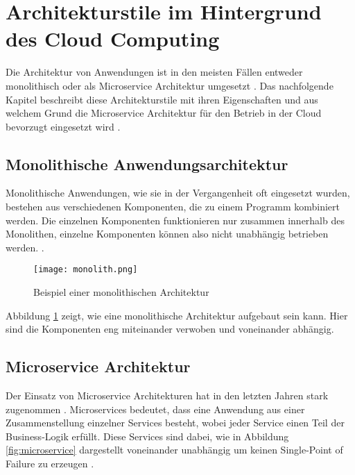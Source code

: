 \section{Architekturstile im Hintergrund des Cloud Computing}
\label{sec:architekturstile}
Die Architektur von Anwendungen ist in den meisten Fällen entweder monolithisch oder als Microservice Architektur umgesetzt \cite[Vgl.][S. 150]{Gos2020}. Das nachfolgende Kapitel beschreibt diese Architekturstile mit ihren Eigenschaften und aus welchem Grund die Microservice Architektur für den Betrieb in der Cloud bevorzugt eingesetzt wird \cite[Vgl.][S. 1]{Villamizar2015}.

\subsection{Monolithische Anwendungsarchitektur}
Monolithische Anwendungen, wie sie in der Vergangenheit oft eingesetzt wurden, bestehen aus verschiedenen Komponenten, die zu einem Programm kombiniert werden. Die einzelnen Komponenten funktionieren nur zusammen innerhalb des Monolithen, einzelne Komponenten können also nicht unabhängig betrieben werden. \cite[Vgl.][S. 1]{Gos2020}.

\begin{figure}[H]
    \centering
    \texttt{[image: monolith.png]}
    \caption{Beispiel einer monolithischen Architektur \cite[Nachbildung angelehnt an][S. 150]{Gos2020}}
    \label{fig:monolith}
\end{figure}

Abbildung \ref{fig:monolith} zeigt, wie eine monolithische Architektur aufgebaut sein kann. Hier sind die Komponenten eng miteinander verwoben und voneinander abhängig.
\pagebreak

\subsection{Microservice Architektur}
Der Einsatz von Microservice Architekturen hat in den letzten Jahren stark zugenommen \cite[Vgl.][S. 150]{Gos2020}. Microservices bedeutet, dass eine Anwendung aus einer Zusammenstellung einzelner Services besteht, wobei jeder Service einen Teil der Business-Logik erfüllt. Diese Services sind dabei, wie in Abbildung \ref{fig:microservice} dargestellt voneinander unabhängig um keinen Single-Point of Failure zu erzeugen \cite[Vgl.][S. 150]{Gos2020}\cite[Vgl.][]{Janssen2021}\cite[Vgl.][]{Fowler2014}.

